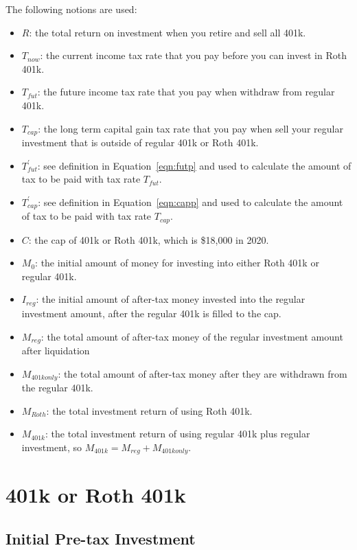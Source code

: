 \documentclass[twocolumn]{article}
\begin{document}
The following notions are used:
\begin{itemize}
  \item $R$: the total return on investment when you retire and sell all 401k.
  \item $T_{now}$: the current income tax rate that you pay before you can
    invest in Roth 401k.
  \item $T_{fut}$: the future income tax rate that you pay when withdraw from
    regular 401k.
  \item $T_{cap}$: the long term capital gain tax rate that you pay when sell
    your regular investment that is outside of regular 401k or Roth 401k.
    \item $T_{fut}^{\prime}$: see definition in Equation~\ref{eqn:futp} and used to
    calculate the amount of tax to be paid with tax rate $T_{fut}$.
    \item $T_{cap}^{\prime}$: see definition in Equation~\ref{eqn:capp} and used to
    calculate the amount of tax to be paid with tax rate $T_{cap}$.
  \item $C$: the cap of 401k or Roth 401k, which is \$18,000 in 2020.
  \item $M_{0}$: the initial amount of money for investing into either Roth 401k or
  regular 401k.
  \item $I_{reg}$: the initial amount of after-tax money invested into the
  regular investment amount, after the regular 401k is filled to the cap.
  \item $M_{reg}$: the total amount of after-tax money of the
  regular investment amount after liquidation
  \item $M_{401konly}$: the total amount of after-tax money after they are
  withdrawn from the regular 401k.
  \item $M_{Roth}$: the total investment return of using Roth 401k.
  \item $M_{401k}$: the total investment return of using regular 401k plus
    regular investment, so $M_{401k} = M_{reg} + M_{401konly}$.
\end{itemize}

\section{401k or Roth 401k}
\subsection{Initial Pre-tax Investment}
\end{document}

